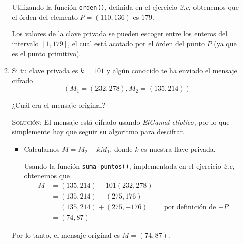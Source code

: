 \documentclass[letterpaper,11pt]{article}
\begin{document}
\begin{enumerate}
\begin{enumerate}
        Utilizando la función \texttt{orden()}, definida en el ejercicio 
        \textit{2.c}, obtenemos que el órden del elemento $P = (110, 136)$ es
        $179$. 
        
        Los valores de la clave privada se pueden escoger entre los enteros
        del intervalo $[1, 179]$, el cual está acotado por el órden del punto 
        $P$ (ya que es el punto primitivo).

        \item Si tu clave privada es $k = 101$ y algún conocido te ha enviado 
        el mensaje cifrado
        \begin{equation*}
            (M_1 = (232, 278), M_2 = (135, 214))
        \end{equation*}

        ¿Cuál era el mensaje original?

        \textsc{Solución:} El mensaje está cifrado usando \textit{ElGamal 
        elíptico}, por lo que simplemente hay que seguir su algoritmo para
        descifrar.
        \begin{itemize}
            \item Calculamos $M = M_2 - kM_1$, donde $k$ es nuestra llave 
            privada. 
            
            Usando la función \texttt{suma\_puntos()}, implementada en el
            ejercicio \textit{2.c}, obtenemos que 
            \begin{align*}
                M
                &= (135, 214) - 101(232, 278) \\ 
                &= (135, 214) - (275, 176) \\
                &= (135, 214) + (275, -176) 
                && \text{por definición de $-P$} \\ 
                &= (74, 87)
            \end{align*}
        \end{itemize}
        
        Por lo tanto, el mensaje original es $M = (74, 87)$.

    \end{enumerate}


\end{enumerate}
\end{document}
